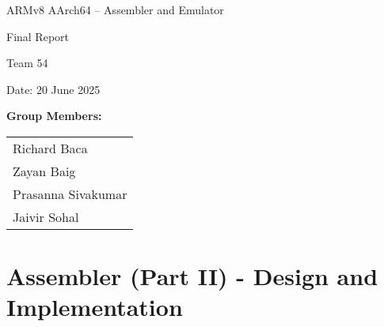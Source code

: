 \documentclass[11pt]{article}
\begin{document}
\begin{titlepage}
    \centering
    \vspace*{2cm}
    
    {\huge ARMv8 AArch64 – Assembler and Emulator\par}
    
    \vspace{1.5cm}
    
    {\LARGE Final Report\par}
    
    \vspace{0.5cm}
   
    \vfill %
    
    {\Large Team 54\par}
    
    \vspace{1cm}
    
    {\large Date: 20 June 2025\par}
    
    \vspace{1cm}
    
    \textbf{Group Members:}\\
    \begin{large}
        \begin{tabular}{l}
            Richard Baca\\
            Zayan Baig\\
            Prasanna Sivakumar\\
            Jaivir Sohal\\
        \end{tabular}
    \end{large}

    \vspace*{2cm}
    
\end{titlepage}

\newpage %

\section{Assembler (Part II) - Design and Implementation}
\end{document}
